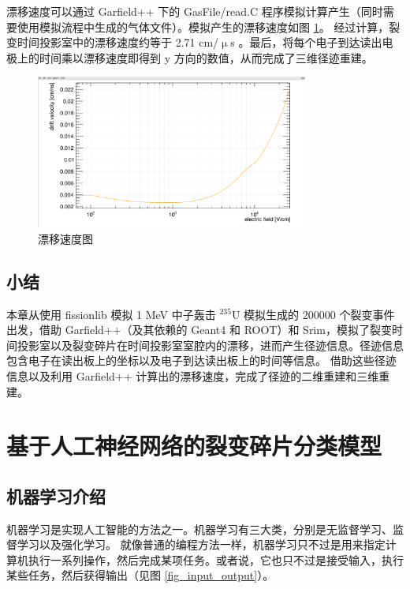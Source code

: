 \documentclass[AutoFakeBold]{LZUThesis}
\begin{document}
漂移速度可以通过 Garfield++ 下的 GasFile/read.C 程序模拟计算产生（同时需要使用模拟流程中生成的气体文件）。模拟产生的漂移速度如图 \ref{fig_drift_velocity}。
经过计算，裂变时间投影室中的漂移速度约等于 2.71 cm/$\upmu$s 。最后，将每个电子到达读出电极上的时间乘以漂移速度即得到 y 方向的数值，从而完成了三维径迹重建。

\begin{figure}[H]
    \centering
    \includegraphics[width=0.8\textwidth]{figures/drift_velocity.png}
    \caption{漂移速度图}
    \label{fig_drift_velocity}
\end{figure}



\section{小结}
本章从使用 fissionlib 模拟 1 MeV 中子轰击 $^{235}$U 模拟生成的 200000 个裂变事件出发，借助 Garfield++（及其依赖的 Geant4 和 ROOT）和 Srim，模拟了裂变时间投影室以及裂变碎片在时间投影室室腔内的漂移，进而产生径迹信息。径迹信息包含电子在读出板上的坐标以及电子到达读出板上的时间等信息。
借助这些径迹信息以及利用 Garfield++ 计算出的漂移速度，完成了径迹的二维重建和三维重建。













\chapter{基于人工神经网络的裂变碎片分类模型}
\section{机器学习介绍}
机器学习是实现人工智能的方法之一。机器学习有三大类，分别是无监督学习、监督学习以及强化学习。
就像普通的编程方法一样，机器学习只不过是用来指定计算机执行一系列操作，然后完成某项任务。或者说，它也只不过是接受输入，执行某些任务，然后获得输出（见图 \ref{fig_input_output}）。
\end{document}
